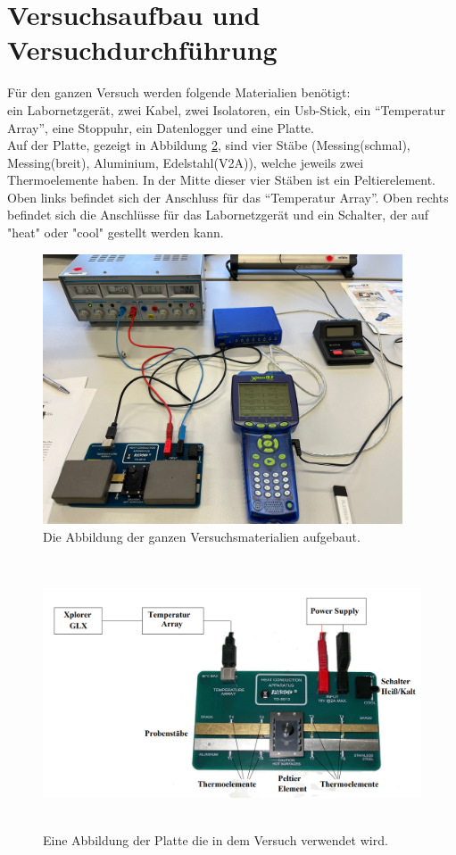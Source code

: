 \section{Versuchsaufbau und Versuchdurchführung}

\begin{flushleft}
    Für den ganzen Versuch werden folgende Materialien benötigt:\\
    ein Labornetzgerät, zwei Kabel, zwei Isolatoren, ein Usb-Stick, ein \enquote{Temperatur Array}, eine Stoppuhr, 
    ein Datenlogger und eine Platte.\\
    \vspace{0.5cm}
    Auf der Platte, gezeigt in Abbildung \ref{Abbildung2}, sind vier Stäbe (Messing(schmal), Messing(breit), Aluminium, Edelstahl(V2A)), welche jeweils zwei Thermoelemente haben.
    In der Mitte dieser vier Stäben ist ein Peltierelement.
    Oben links befindet sich der Anschluss für das \enquote{Temperatur Array}. 
    Oben rechts befindet sich die Anschlüsse für das Labornetzgerät und ein Schalter, der auf "heat" oder "cool" gestellt werden kann.  
\end{flushleft}

\begin{figure}[H]
    \centering
    \includegraphics[height=80mm]{bilder/aufbau.jpeg}
    \caption{Die Abbildung der ganzen Versuchsmaterialien aufgebaut. \label{Abbildung1} }
\end{figure}

\begin{figure}[H]
    \centering
    \includegraphics[height=80mm]{bilder/Platte1.png} 
    \caption{Eine Abbildung der Platte die in dem Versuch verwendet wird. \cite[3]{a1} \label{Abbildung2} }
\end{figure}


